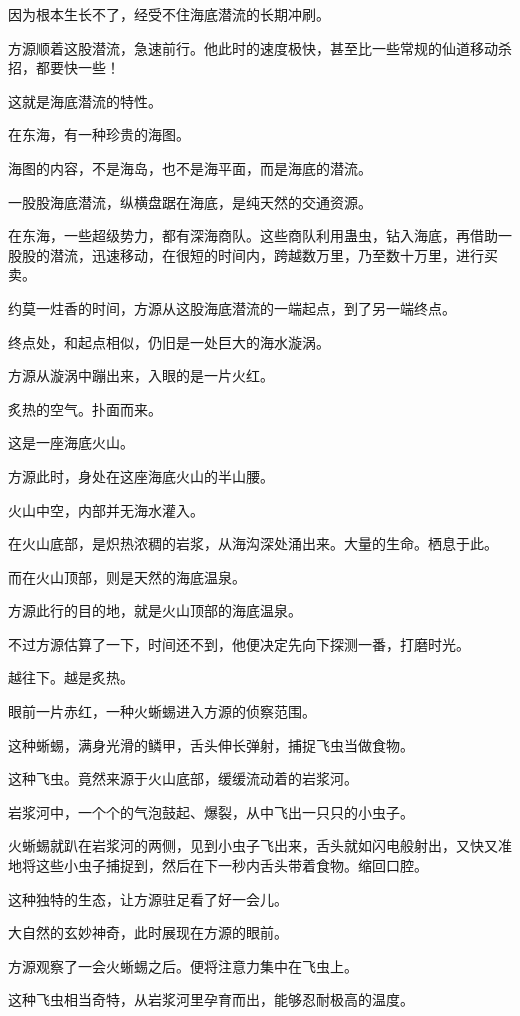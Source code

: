 \begin{this_body}
因为根本生长不了，经受不住海底潜流的长期冲刷。

方源顺着这股潜流，急速前行。他此时的速度极快，甚至比一些常规的仙道移动杀招，都要快一些！

这就是海底潜流的特性。

在东海，有一种珍贵的海图。

海图的内容，不是海岛，也不是海平面，而是海底的潜流。

一股股海底潜流，纵横盘踞在海底，是纯天然的交通资源。

在东海，一些超级势力，都有深海商队。这些商队利用蛊虫，钻入海底，再借助一股股的潜流，迅速移动，在很短的时间内，跨越数万里，乃至数十万里，进行买卖。

约莫一炷香的时间，方源从这股海底潜流的一端起点，到了另一端终点。

终点处，和起点相似，仍旧是一处巨大的海水漩涡。

方源从漩涡中蹦出来，入眼的是一片火红。

炙热的空气。扑面而来。

这是一座海底火山。

方源此时，身处在这座海底火山的半山腰。

火山中空，内部并无海水灌入。

在火山底部，是炽热浓稠的岩浆，从海沟深处涌出来。大量的生命。栖息于此。

而在火山顶部，则是天然的海底温泉。

方源此行的目的地，就是火山顶部的海底温泉。

不过方源估算了一下，时间还不到，他便决定先向下探测一番，打磨时光。

越往下。越是炙热。

眼前一片赤红，一种火蜥蜴进入方源的侦察范围。

这种蜥蜴，满身光滑的鳞甲，舌头伸长弹射，捕捉飞虫当做食物。

这种飞虫。竟然来源于火山底部，缓缓流动着的岩浆河。

岩浆河中，一个个的气泡鼓起、爆裂，从中飞出一只只的小虫子。

火蜥蜴就趴在岩浆河的两侧，见到小虫子飞出来，舌头就如闪电般射出，又快又准地将这些小虫子捕捉到，然后在下一秒内舌头带着食物。缩回口腔。

这种独特的生态，让方源驻足看了好一会儿。

大自然的玄妙神奇，此时展现在方源的眼前。

方源观察了一会火蜥蜴之后。便将注意力集中在飞虫上。

这种飞虫相当奇特，从岩浆河里孕育而出，能够忍耐极高的温度。


\end{this_body}
